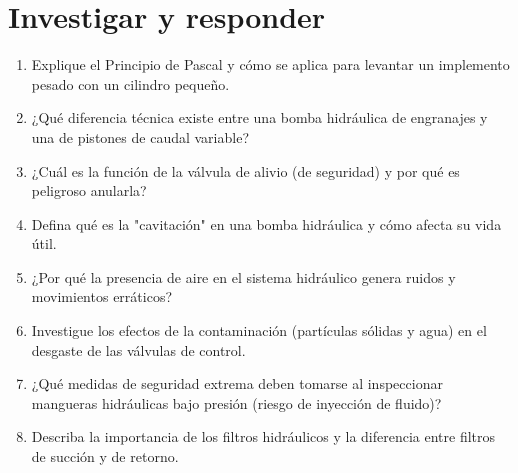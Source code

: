 \section*{\faPencil\space Investigar y responder}
\begin{enumerate}
	\item Explique el Principio de Pascal y cómo se aplica para levantar un implemento
	      pesado con un cilindro pequeño.
	\item ¿Qué diferencia técnica existe entre una bomba hidráulica de engranajes y
	      una de pistones de caudal variable?
	\item ¿Cuál es la función de la válvula de alivio (de seguridad) y por qué es
	      peligroso anularla?
	\item Defina qué es la "cavitación" en una bomba hidráulica y cómo afecta su
	      vida útil.
	\item ¿Por qué la presencia de aire en el sistema hidráulico genera ruidos y
	      movimientos erráticos?
	\item Investigue los efectos de la contaminación (partículas sólidas y agua) en
	      el desgaste de las válvulas de control.
	\item ¿Qué medidas de seguridad extrema deben tomarse al inspeccionar mangueras
	      hidráulicas bajo presión (riesgo de inyección de fluido)?
	\item Describa la importancia de los filtros hidráulicos y la diferencia entre
	      filtros de succión y de retorno.
\end{enumerate}

